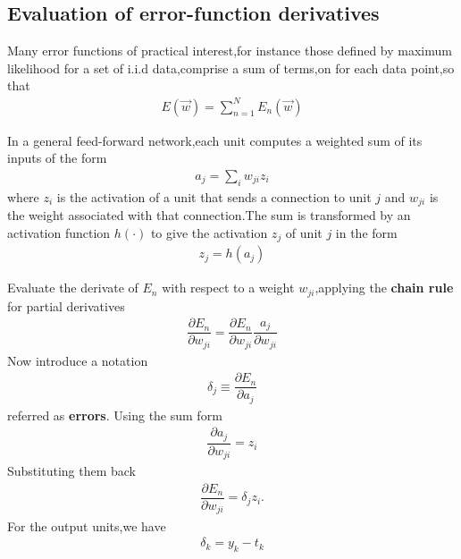 \subsection{Evaluation of error-function derivatives}
Many error functions of practical interest,for instance those defined by maximum likelihood for a set of i.i.d data,comprise a sum of terms,on for each data point,so that
\begin{align}
    E(\vec{w})=\sum_{n=1}^{N}E_n(\vec{w})
\end{align}

In a general feed-forward network,each unit computes a weighted sum of its inputs of the form
\begin{align}
    a_j=\sum_i w_{ji} z_i
\end{align}
where $z_i$ is the activation of a unit that sends a connection to unit $j$ and $w_{ji}$ is the weight associated with that connection.The sum is transformed by an activation function $h(\cdot)$ to give the activation $z_j$ of unit $j$ in the form
\begin{align}
    z_j=h(a_j)
\end{align}

Evaluate the derivate of $E_n$ with respect to a weight $w_{ji}$,applying the \textbf{chain rule} for partial derivatives
\begin{align}
    \dfrac{\partial E_n}{\partial w_{ji}}=\dfrac{\partial E_n}{\partial w_{ji}}\dfrac{a_j}{\partial w_{ji}}
\end{align}
Now introduce a notation
\begin{align}
    \delta_j \equiv \dfrac{\partial E_n}{\partial a_j}
\end{align}
referred as \textbf{errors}.
Using the sum form
\begin{align}
    \dfrac{\partial a_j}{\partial w_{ji}} = z_i
\end{align}
Substituting them back
\begin{align}
    \dfrac{\partial E_n}{\partial w_{ji}}=\delta_j z_i.
\end{align}
For the output units,we have
\begin{align}
    \delta_k=y_k-t_k
\end{align}

